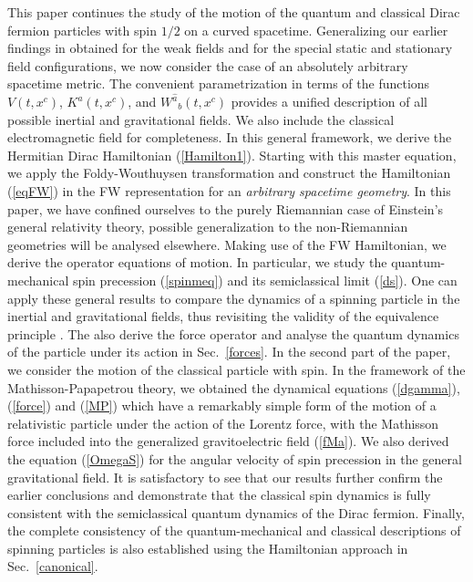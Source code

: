 \documentclass[preprint,showpacs,preprintnumbers,eqsecnum,amsmath,amssymb]{revtex4-1}
\begin{document}
This paper continues the study of the motion of the quantum and classical Dirac
fermion particles with spin $1/2$ on a curved spacetime. Generalizing our earlier
findings in \cite{PRD,PRD2,Warszawa,OST,ostrong} obtained for the weak fields and
for the special static and stationary field configurations, we now consider the case
of an absolutely arbitrary spacetime metric. The convenient parametrization in terms
of the functions $V(t,x^c)$, $K^a(t,x^c)$, and $W^{\widehat a}{}_b(t,x^c)$ provides a
unified description of all possible inertial and gravitational fields. We also
include the classical electromagnetic field for completeness. In this general
framework, we derive the Hermitian Dirac Hamiltonian (\ref{Hamilton1}). Starting
with this master equation, we apply the Foldy-Wouthuysen transformation \cite{PRA}
and construct the Hamiltonian (\ref{eqFW}) in the FW representation for an {\it
arbitrary spacetime geometry}. In this paper, we have confined ourselves to the
purely Riemannian case of Einstein's general relativity theory, possible generalization
to the non-Riemannian geometries will be analysed elsewhere. Making use of the FW
Hamiltonian, we derive the operator equations of motion. In particular, we study
the quantum-mechanical spin precession (\ref{spinmeq}) and its semiclassical
limit (\ref{ds}). One can apply these general results to compare the dynamics of
a spinning particle in the inertial and gravitational fields, thus revisiting the
validity of the equivalence principle \cite{MO}. The also derive the force operator
and analyse the quantum dynamics of the particle under its action in Sec.~\ref{forces}.
In the second part of the paper, we consider the motion of the classical particle
with spin. In the framework of the Mathisson-Papapetrou theory, we obtained the 
dynamical equations (\ref{dgamma}), (\ref{force}) and (\ref{MP}) which have a 
remarkably simple form of the motion of a relativistic particle under the action 
of the Lorentz force, with the Mathisson force included into the generalized 
gravitoelectric field (\ref{fMa}). We also derived the equation (\ref{OmegaS}) for 
the angular velocity of spin precession in the general gravitational field. It is 
satisfactory to see that our results further confirm the earlier conclusions 
\cite{OST,ostrong} and demonstrate that the classical spin dynamics is fully 
consistent with the semiclassical quantum dynamics of the Dirac fermion. Finally, 
the complete consistency of the quantum-mechanical and classical descriptions of 
spinning particles is also established using the Hamiltonian approach in 
Sec.~\ref{canonical}.
\end{document}
